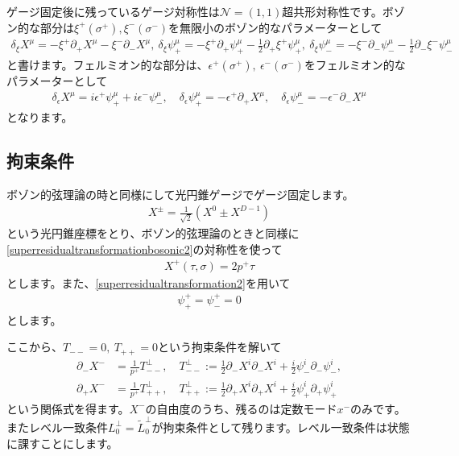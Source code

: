 \documentclass[report,paper=a4, fontsize=12pt, line_length=16cm, number_of_lines=34,dvipdfmx]{jlreq}
\numberwithin{equation}{chapter}
\numberwithin{equation}{section}
\newcommand{\Ncal}{\mathcal{N}}
\newcommand{\del}{\partial}
\newcommand{\Lt}{\widetilde{L}}
\begin{document}
ゲージ固定後に残っているゲージ対称性は$\Ncal=(1,1)$超共形対称性です。ボゾン的な部分は$\xi^{+}(\sigma^{+}),\xi^{-}(\sigma^{-})$を無限小のボゾン的なパラメーターとして
\begin{align}
  \delta_{\xi}X^{\mu}=-\xi^{+}\del_{+}X^{\mu}-\xi^{-}\del_{-}X^{\mu},\ 
  \delta_{\xi}\psi^{\mu}_{+}=-\xi^{+}\del_{+}\psi^{\mu}_{+}-\frac12 \del_{+}\xi^{+}\psi^{\mu}_{+},\ 
  \delta_{\xi}\psi^{\mu}_{-}=-\xi^{-}\del_{-}\psi^{\mu}_{-}-\frac12 \del_{-}\xi^{-}\psi^{\mu}_{-}\label{superresidualtransformationbosonic2}
\end{align}    
と書けます。フェルミオン的な部分は、$\epsilon^{+}(\sigma^{+}),\ \epsilon^{-}(\sigma^{-})$をフェルミオン的なパラメーターとして
\begin{align}
  \delta_{\epsilon}X^{\mu}=i\epsilon^{+}\psi^{\mu}_{+}+i\epsilon^{-}\psi^{\mu}_{-}
  ,\quad
  \delta_{\epsilon}\psi^{\mu}_{+}=-\epsilon^{+}\del_{+}X^{\mu}
  ,\quad
  \delta_{\epsilon}\psi^{\mu}_{-}=-\epsilon^{-}\del_{-}X^{\mu}
  \label{superresidualtransformation2}
\end{align}    
となります。

\subsection{拘束条件}
ボゾン的弦理論の時と同様にして光円錐ゲージでゲージ固定します。
\begin{align}
  X^{\pm}=\frac{1}{\sqrt{2}}(X^{0}\pm X^{D-1})
\end{align}
という光円錐座標をとり、ボゾン的弦理論のときと同様に\eqref{superresidualtransformationbosonic2}の対称性を使って
\begin{align}
  X^{+}(\tau,\sigma)=2p^{+} \tau
\end{align}
とします。また、\eqref{superresidualtransformation2}を用いて
\begin{align}
  \psi^{+}_{+}=\psi^{+}_{-}=0
\end{align}
とします。

ここから、$T_{--}=0,\ T_{++}=0$という拘束条件を解いて
\begin{align}
  \del_{-}X^{-}&=\frac{1}{p^{+}}T^{\perp}_{--},\quad T^{\perp}_{--}:=\frac12\del_{-}X^{i}\del_{-}X^{i}+\frac{i}{2}\psi^{i}_{-}\del_{-}\psi^{i}_{-}
  ,\label{alpha-zeromode}\\
  \del_{+}X^{-}&=\frac{1}{p^{+}}T^{\perp}_{++},\quad T^{\perp}_{++}:=\frac12\del_{+}X^{i}\del_{+}X^{i}+\frac{i}{2}\psi^{i}_{+}\del_{+}\psi^{i}_{+}
  \label{alphatilde-zeromode}
\end{align}
という関係式を得ます。$X^{-}$の自由度のうち、残るのは定数モード$x^{-}$のみです。またレベル一致条件$L^{\perp}_0=\Lt^{\perp}_0$が拘束条件として残ります。レベル一致条件は状態に課すことにします。
\end{document}
